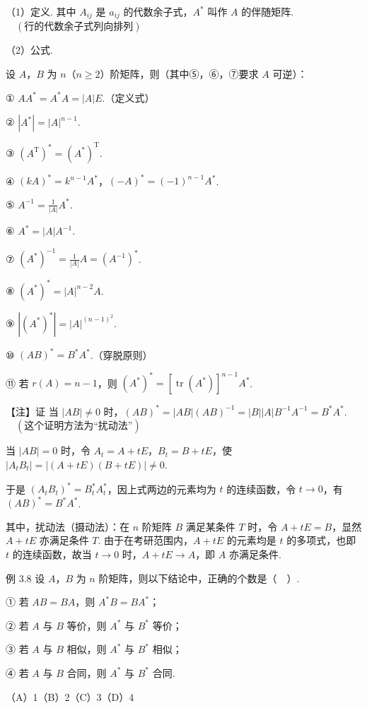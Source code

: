 （1）定义.
其中 $A_{ij}$ 是 $a_{ij}$ 的代数余子式，$A^*$ 叫作 $A$ 的伴随矩阵. $\quad(\text{行的代数余子式列向排列})$

（2）公式.

设 $A$，$B$ 为 $n$（$n\ge2$）阶矩阵，则（其中⑤，⑥，⑦要求 $A$ 可逆）：

① $AA^*=A^*A=|A|E$.（定义式）

② $|A^*|=|A|^{n-1}$.

③ $(A^{\mathrm T})^*=(A^*)^{\mathrm T}$.


④ $(kA)^*=k^{n-1}A^*$，$(-A)^*=(-1)^{n-1}A^*$.

⑤ $A^{-1}=\frac{1}{|A|}A^*$.

⑥ $A^*=|A|A^{-1}$.

⑦ $(A^*)^{-1}=\frac{1}{|A|}A=(A^{-1})^*$.

⑧ $(A^*)^*=|A|^{n-2}A$.

⑨ $|(A^*)^*|=|A|^{(n-1)^2}$.

⑩ $(AB)^*=B^*A^*$.（穿脱原则）

⑪ 若 $r(A)=n-1$，则 $(A^*)^*=[\operatorname{tr}(A^*)]^{n-1}A^*$.

\begin{fnote}
【注】证 当 $|AB|\ne0$ 时，$(AB)^*=|AB|(AB)^{-1}=|B||A|B^{-1}A^{-1}=B^*A^*$. $\quad(\text{这个证明方法为“扰动法”})$

当 $|AB|=0$ 时，令 $A_t=A+tE$，$B_t=B+tE$，使 $|A_tB_t|=|(A+tE)(B+tE)|\ne0$.

于是 $(A_tB_t)^*=B_t^*A_t^*$，因上式两边的元素均为 $t$ 的连续函数，令 $t\to0$，有 $(AB)^*=B^*A^*$.

其中，扰动法（摄动法）：在 $n$ 阶矩阵 $B$ 满足某条件 $T$ 时，令 $A+tE=B$，显然 $A+tE$ 亦满足条件 $T$. 由于在考研范围内，$A+tE$ 的元素均是 $t$ 的多项式，也即 $t$ 的连续函数，故当 $t\to0$ 时，$A+tE\to A$，即 $A$ 亦满足条件.
\end{fnote}

\begin{fcard}{例 3.8}
设 $A$，$B$ 为 $n$ 阶矩阵，则以下结论中，正确的个数是（　）.

① 若 $AB=BA$，则 $A^*B=BA^*$；

② 若 $A$ 与 $B$ 等价，则 $A^*$ 与 $B^*$ 等价；

③ 若 $A$ 与 $B$ 相似，则 $A^*$ 与 $B^*$ 相似；

④ 若 $A$ 与 $B$ 合同，则 $A^*$ 与 $B^*$ 合同.

（A）1\qquad（B）2\qquad（C）3\qquad（D）4
\end{fcard}

